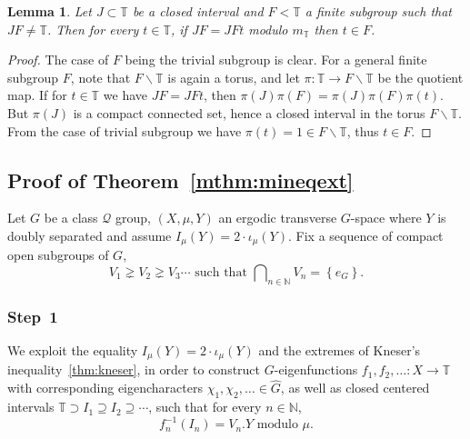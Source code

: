 \documentclass{amsart}
\numberwithin{equation}{subsection}
\newtheorem{lem}[thm]{Lemma}
\theoremstyle{remark}
\begin{document}
\begin{lem}\label{lem:genlem3}
Let \(J\subset\mathbb{T}\) be a closed interval and \(F<\mathbb{T}\) a finite subgroup such that \(JF\neq\mathbb{T}\). Then for every \(t\in\mathbb{T}\), if \(JF=JFt\) modulo \(m_{\mathbb{T}}\) then \(t\in F\).
\end{lem}

\begin{proof}
The case of \(F\) being the trivial subgroup is clear. For a general finite subgroup \(F\), note that \(F\backslash\mathbb{T}\) is again a torus, and let \(\pi:\mathbb{T}\to F\backslash\mathbb{T}\) be the quotient map. If for \(t\in\mathbb{T}\) we have \(JF=JFt\), then \(\pi\left(J\right)\pi\left(F\right)=\pi\left(J\right)\pi\left(F\right)\pi\left(t\right)\). But \(\pi\left(J\right)\) is a compact connected set, hence a closed interval in the torus \(F\backslash\mathbb{T}\). From the case of trivial subgroup we have \(\pi\left(t\right)=1\in F\backslash\mathbb{T}\), thus \(t\in F\).
\end{proof}

\subsection{Proof of Theorem~\ref{mthm:mineqext}}

Let \(G\) be a class \(\mathcal{Q}\) group, \(\left(X,\mu,Y\right)\) an ergodic transverse \(G\)-space where \(Y\) is doubly separated and assume \(I_{\mu}\left(Y\right)=2\cdot\iota_{\mu}\left(Y\right)\). Fix a sequence of compact open subgroups of \(G\),
\[V_{1}\gneq V_{2}\gneq V_{3}\dotsm\text{ such that }\bigcap\nolimits_{n\in\mathbb{N}}V_{n}=\left\{e_{G}\right\}.\]

\subsubsection*{\textbf{Step~1}}

We exploit the equality \(I_{\mu}\left(Y\right)=2\cdot\iota_{\mu}\left(Y\right)\) and the extremes of Kneser's inequality~\ref{thm:kneser}, in order to construct \(G\)-eigenfunctions \(f_{1},f_{2},\dotsc:X\to\mathbb{T}\) with corresponding eigencharacters \(\chi_{1},\chi_{2},\dotsc\in\widehat{G}\), as well as closed centered intervals \(\mathbb{T}\supset I_{1}\supseteq I_{2}\supseteq\dotsm\), such that for every \(n\in\mathbb{N}\),
\[f_{n}^{-1}\left(I_{n}\right)=V_{n}.Y\text{ modulo }\mu.\]

\smallskip
\end{document}
